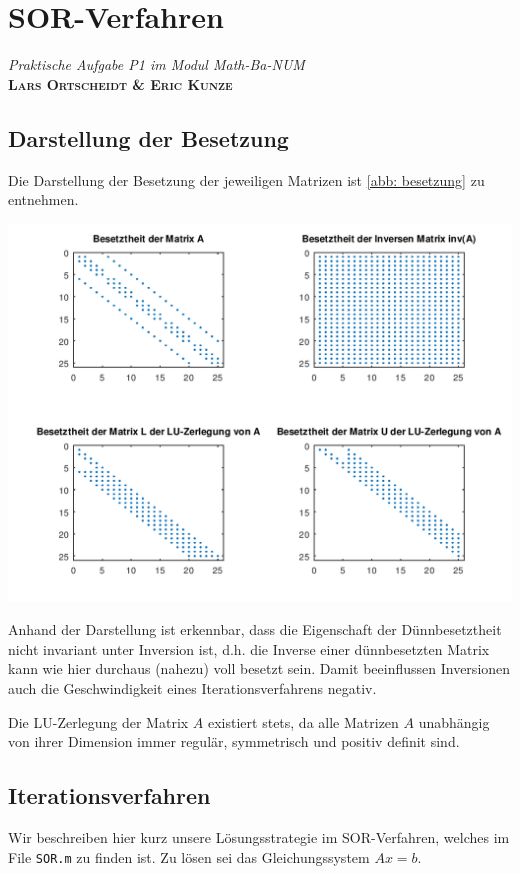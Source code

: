 \documentclass[ %
ngerman, %
a4paper, %
sectionreset, %
chapterstyle=framed, %
sectionstyle=dotted, %
titlefont=osfamily %
]{../../../../texmf/tex/latex/mathscriptMathTUD/mathscriptMathTUD}
\institute{Numerik}
\begin{document}
    
    \chapter*{SOR-Verfahren}
    \begin{center}
    	\textit{Praktische Aufgabe P1 im Modul Math-Ba-NUM} \\
    	\Large{\bfseries \textsc{Lars Ortscheidt \& Eric Kunze}}
    \end{center}
    
    \section{Darstellung der Besetzung}
    Die Darstellung der Besetzung der jeweiligen Matrizen ist \cref{abb: besetzung}
	zu entnehmen.
	\begin{center}
		\includegraphics[scale=0.5]{../besetztheit.png}
		\label{abb: besetzung}
	\end{center}
	
	Anhand der Darstellung ist erkennbar, dass die Eigenschaft der Dünnbesetztheit nicht invariant unter Inversion ist, d.h. die Inverse einer dünnbesetzten Matrix kann wie hier durchaus (nahezu) voll besetzt sein. Damit beeinflussen Inversionen auch die Geschwindigkeit eines Iterationsverfahrens negativ.
	
	Die LU-Zerlegung der Matrix $A$ existiert stets, da alle Matrizen $A$ unabhängig von ihrer Dimension immer regulär, symmetrisch und positiv definit sind.
	
	\section{Iterationsverfahren}
	Wir beschreiben hier kurz unsere Lösungsstrategie im SOR-Verfahren, welches im File \texttt{SOR.m} zu finden ist. Zu lösen sei das Gleichungssystem $Ax = b$. 
	
\end{document}

